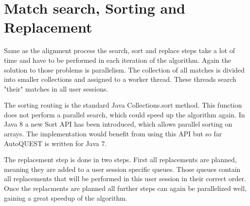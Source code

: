 \section{Match search, Sorting and Replacement}
Same as the alignment process the search, sort and replace steps take a lot of time and have to be performed in each iteration of the algorithm.
Again the solution to those problems is parallelism. The collection of all matches is divided into smaller collections and assigned to a worker thread. These threads
search "their" matches in all user sessions. 

The sorting routing is the standard Java Collections.sort method. This function does not perform a parallel search, which could speed up the algorithm again.
In Java 8 a new Sort API has been introduced, which allows parallel sorting on arrays. The implementation would  benefit from using this API but so far AutoQUEST is written for Java 7. 

The replacement step is done in two steps. First all replacements are planned, meaning they are added to a user session specific queues. 
Those queues contain all replacements that will be performed in this user session in their correct order. 
Once the replacments are planned all further steps can again be parallelized well, gaining a great speedup of the algorithm.




